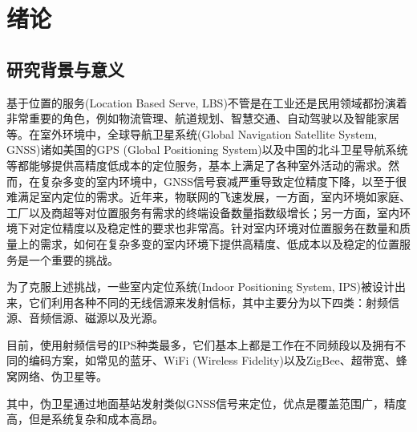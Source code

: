 \chapter{绪论}

\section{研究背景与意义}
基于位置的服务(Location Based Serve, LBS)不管是在工业还是民用领域都扮演着非常重要的角色，例如物流管理、航道规划、智慧交通、自动驾驶以及智能家居等\cite{iot-lbs}。在室外环境中，全球导航卫星系统(Global Navigation Satellite System, GNSS)诸如美国的GPS (Global Positioning System)以及中国的北斗卫星导航系统等都能够提供高精度低成本的定位服务，基本上满足了各种室外活动的需求。然而，在复杂多变的室内环境中，GNSS信号衰减严重导致定位精度下降，以至于很难满足室内定位的需求\cite{裴凌2017室内定位技术与应用综述,ips-gnss-mehrabian2023sensor}。近年来，物联网的飞速发展，一方面，室内环境如家庭、工厂以及商超等对位置服务有需求的终端设备数量指数级增长；另一方面，室内环境下对定位精度以及稳定性的要求也非常高。针对室内环境对位置服务在数量和质量上的需求，如何在复杂多变的室内环境下提供高精度、低成本以及稳定的位置服务是一个重要的挑战。

为了克服上述挑战，一些室内定位系统(Indoor Positioning System, IPS)被设计出来，它们利用各种不同的无线信源来发射信标，其中主要分为以下四类：射频信源、音频信源、磁源以及光源\cite{陈锐志2017基于智能手机的室内定位技术的发展现状和挑战,ips-wahab2022indoor}。

目前，使用射频信号的IPS种类最多，它们基本上都是工作在不同频段以及拥有不同的编码方案，如常见的蓝牙、WiFi (Wireless Fidelity)以及ZigBee、超带宽、蜂窝网络、伪卫星等\cite{闫大禹2019国内室内定位技术发展现状综述}。

其中，伪卫星通过地面基站发射类似GNSS信号来定位，优点是覆盖范围广，精度高，但是系统复杂和成本高昂\cite{李占营2018基于伪卫星技术的室内定位系统硬件设计及实现}。

